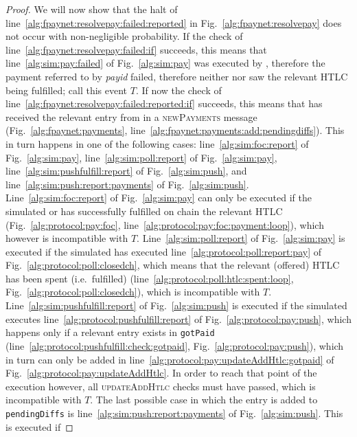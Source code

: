 \begin{proof}
  We will now show that the halt of
  line~\ref{alg:fpaynet:resolvepay:failed:reported} in
  Fig.~\ref{alg:fpaynet:resolvepay} does not occur with non-negligible
  probability. If the check of line~\ref{alg:fpaynet:resolvepay:failed:if}
  succeeds, this means that line~\ref{alg:sim:pay:failed} of
  Fig.~\ref{alg:sim:pay} was executed by \simulator{}, therefore the payment
  referred to by \textit{payid} failed, therefore neither \alice{} nor \bob{}
  saw the relevant HTLC being fulfilled; call this event $T$. If now the check
  of line~\ref{alg:fpaynet:resolvepay:failed:reported:if} succeeds, this means
  that \fpaynet{} has received the relevant entry from \simulator{} in a
  \textsc{newPayments} message (Fig.~\ref{alg:fpaynet:payments},
  line~\ref{alg:fpaynet:payments:add:pendingdiffs}). This in turn happens in one
  of the following cases: line~\ref{alg:sim:foc:report} of
  Fig.~\ref{alg:sim:pay}, line~\ref{alg:sim:poll:report} of
  Fig.~\ref{alg:sim:pay}, line~\ref{alg:sim:pushfulfill:report} of
  Fig.~\ref{alg:sim:push}, and line~\ref{alg:sim:push:report:payments} of
  Fig.~\ref{alg:sim:push}. Line~\ref{alg:sim:foc:report} of
  Fig.~\ref{alg:sim:pay} can only be executed if the simulated \alice{} or
  \bob{} has successfully fulfilled on chain the relevant HTLC
  (Fig.~\ref{alg:protocol:pay:foc},
  line~\ref{alg:protocol:pay:foc:payment:loop}), which however is incompatible
  with $T$. Line~\ref{alg:sim:poll:report} of Fig.~\ref{alg:sim:pay} is executed
  if the simulated \alice{} has executed line~\ref{alg:protocol:poll:report:pay}
  of Fig.~\ref{alg:protocol:poll:closedch}, which means that the relevant
  (offered) HTLC has been spent (i.e.\ fulfilled)
  (line~\ref{alg:protocol:poll:htlc:spent:loop},
  Fig.~\ref{alg:protocol:poll:closedch}), which is incompatible with $T$.
  Line~\ref{alg:sim:pushfulfill:report} of Fig.~\ref{alg:sim:push} is executed
  if the simulated \bob{} executes line~\ref{alg:protocol:pushfulfill:report} of
  Fig.~\ref{alg:protocol:pay:push}, which happens only if a relevant entry
  exists in \texttt{gotPaid} (line~\ref{alg:protocol:pushfulfill:check:gotpaid},
  Fig.~\ref{alg:protocol:pay:push}), which in turn can only be added in
  line~\ref{alg:protocol:pay:updateAddHtlc:gotpaid} of
  Fig.~\ref{alg:protocol:pay:updateAddHtlc}. In order to reach that point of the
  execution however, all \textsc{updateAddHtlc} checks must have passed, which
  is incompatible with $T$. The last possible case in which the entry is added
  to \texttt{pendingDiffs} is line~\ref{alg:sim:push:report:payments} of
  Fig.~\ref{alg:sim:push}. This is executed if

\end{proof}
